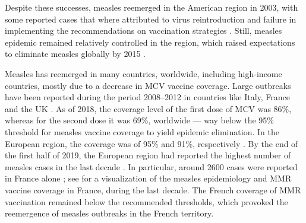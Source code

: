Despite these successes, measles reemerged in the American region in 2003, with some reported cases that where attributed to virus reintroduction and failure in implementing the recommendations on vaccination strategies \cite[]{MMWR_MeaslesErradication1997,DeQuadros2004,Andrus2011}. Still, measles epidemic remained relatively controlled in the region, which raised expectations to eliminate measles globally by 2015 \cite[]{DeQuadros2004}. 

Measles has reemerged in many countries, worldwide, including high-income countries, mostly due to a decrease in MCV vaccine coverage. Large outbreaks have been reported during the period 2008--2012 in countries like Italy, France and the UK \cite[]{Amendola2015,Antona2013,Keenan2017,Bechini2019}. As of 2018, the coverage level of the first dose of MCV was 86\%, whereas for the second dose it was 69\%, worldwide \cite[]{Peck2018} --- way below the 95\% threshold for measles vaccine coverage to yield epidemic elimination. In the European region, the coverage was of 95\% and 91\%, respectively \cite[]{Peck2018}. By the end of the first half of 2019, the European region had reported the highest number of measles cases in the last decade \cite[]{WHO_MeaslesEUR2018,ECDC_MR2019}. In particular, around 2600 cases were reported in France alone \cite[]{WHO_MeaslesFrance2020}; see  for a visualization of the measles epidemiology and MMR vaccine coverage in France, during the last decade. The French coverage of MMR vaccination remained below the recommended thresholds, which provoked the reemergence of measles outbreaks in the French territory.


